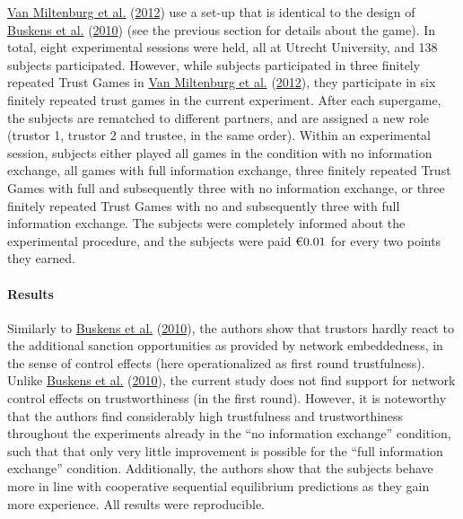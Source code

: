 \documentclass[
  11pt,
]{article}
\begin{document}
\protect\hyperlink{ref-miltenburg_buskens_triads_2012}{Van Miltenburg et al.} (\protect\hyperlink{ref-miltenburg_buskens_triads_2012}{2012}) use a set-up that is identical to the design of \protect\hyperlink{ref-buskens_raub_veer_triads_2010}{Buskens et al.} (\protect\hyperlink{ref-buskens_raub_veer_triads_2010}{2010}) (see the previous section for details about the game).
In total, eight experimental sessions were held, all at Utrecht University, and 138 subjects participated. However, while subjects participated in three finitely repeated Trust Games in \protect\hyperlink{ref-miltenburg_buskens_triads_2012}{Van Miltenburg et al.} (\protect\hyperlink{ref-miltenburg_buskens_triads_2012}{2012}), they participate in six finitely repeated trust games in the current experiment. After each supergame, the subjects are rematched to different partners, and are assigned a new role (trustor 1, trustor 2 and trustee, in the same order). Within an experimental session, subjects either played all games in the condition with no information exchange, all games with full information exchange, three finitely repeated Trust Games with full and subsequently three with no information exchange, or three finitely repeated Trust Games with no and subsequently three with full information exchange. The subjects were completely informed about the experimental procedure, and the subjects were paid \(\text{\texteuro}0.01\) for every two points they earned.

\hypertarget{results-6}{%
\paragraph{Results}\label{results-6}}

Similarly to \protect\hyperlink{ref-buskens_raub_veer_triads_2010}{Buskens et al.} (\protect\hyperlink{ref-buskens_raub_veer_triads_2010}{2010}), the authors show that trustors hardly react to the additional sanction opportunities as provided by network embeddedness, in the sense of control effects (here operationalized as first round trustfulness).
Unlike \protect\hyperlink{ref-buskens_raub_veer_triads_2010}{Buskens et al.} (\protect\hyperlink{ref-buskens_raub_veer_triads_2010}{2010}), the current study does not find support for network control effects on trustworthiness (in the first round). However, it is noteworthy that the authors find considerably high trustfulness and trustworthiness throughout the experiments already in the ``no information exchange'' condition, such that that only very little improvement is possible for the ``full information exchange'' condition. Additionally, the authors show that the subjects behave more in line with cooperative sequential equilibrium predictions as they gain more experience.
All results were reproducible.
\end{document}
